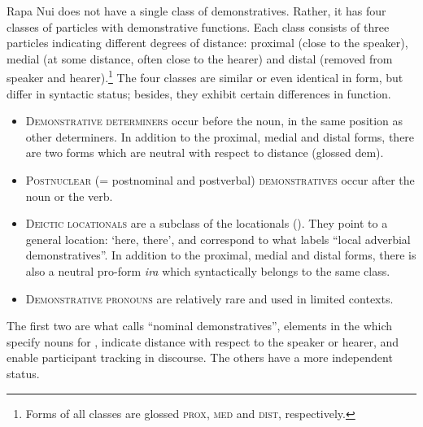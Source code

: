 Rapa Nui does not have a single class of demonstratives. Rather, it has four classes of particles with demonstrative functions. Each class consists of three particles indicating different degrees of distance: proximal (close to the speaker), medial (at some distance, often close to the hearer) and distal (removed from speaker and hearer).\footnote{\label{fn:209}Forms of all classes are glossed \textsc{prox}, \textsc{med} and \textsc{dist}, respectively.} The four classes are similar or even identical in form, but differ in syntactic status; besides, they exhibit certain differences in function. 

\begin{itemize}
\item 
\textsc{Demonstrative determiners} occur before the noun, in the same position as other determiners. In addition to the proximal, medial and distal forms, there are two forms which are neutral with respect to distance (glossed dem).

\item 
\textsc{Postnuclear} (= postnominal and postverbal) \textsc{demonstratives} occur after the noun or the verb.

\item 
\textsc{Deictic locationals} are a subclass of the locationals (). They point to a general location: ‘here, there’, and correspond to what \citet[228]{Dixon2010-2} labels “local adverbial demonstratives”. In addition to the proximal, medial and distal forms, there is also a neutral pro-form \textit{ira} which syntactically belongs to the same class.

\item 
\textsc{Demonstrative pronouns} are relatively rare and used in limited contexts. 

\end{itemize}

The first two are what \citet[225]{Dixon2010-2} calls “nominal demonstratives”, elements in the  which specify nouns for , indicate distance with respect to the speaker or hearer, and enable participant tracking in discourse. The others have a more independent status.

